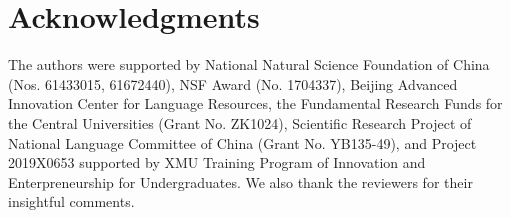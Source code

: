 \documentclass[11pt,a4paper]{article}
\begin{document}
\section*{Acknowledgments}
The authors were supported by National Natural Science Foundation of China (Nos. 61433015, 61672440), 
NSF Award (No. 1704337),
Beijing Advanced Innovation Center for Language Resources, 
the Fundamental Research Funds for the Central Universities (Grant No. ZK1024), 
Scientific Research Project of National Language Committee of China (Grant No. YB135-49), 
and Project 2019X0653 supported by XMU Training Program of Innovation and Enterpreneurship for Undergraduates. 
We also thank the reviewers for their insightful comments.







\end{document}
